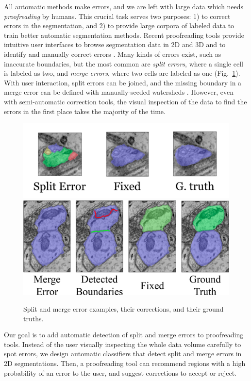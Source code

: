 All automatic methods make errors, and we are left with large data which needs \emph{proofreading} by humans. This crucial task serves two purposes: 1) to correct errors in the segmentation, and 2) to provide large corpora of labeled data to train better automatic segmentation methods. Recent proofreading tools provide intuitive user interfaces to browse segmentation data in 2D and 3D and to identify and manually correct errors \cite{markus_proofreading,raveler,mojo2,haehn_dojo_2014,karimov_guided_volume_editing,uzunbas}. Many kinds of errors exist, such as inaccurate boundaries, but the most common are \emph{split errors}, where a single cell is labeled as two, and \emph{merge errors}, where two cells are labeled as one (Fig.~\ref{fig:merge_error}). With user interaction, split errors can be joined, and the missing boundary in a merge error can be defined with manually-seeded watersheds \cite{haehn_dojo_2014}. However, even with semi-automatic correction tools, the visual inspection of the data to find the errors in the first place takes the majority of the time.

\begin{figure}[t]
\centering
\includegraphics[width=.45\textwidth]{gfx/spliterror.png}
\vspace{+.5mm}
\qquad
\includegraphics[width=.45\textwidth]{gfx/mergeerror.png}
\caption{Split and merge error examples, their corrections, and their ground truths.}
\label{fig:merge_error}
\end{figure}

Our goal is to add automatic detection of split and merge errors to proofreading tools. Instead of the user visually inspecting the whole data volume carefully to spot errors, we design automatic classifiers that detect split and merge errors in 2D segmentations. Then, a proofreading tool can recommend regions with a high probability of an error to the user, and suggest corrections to accept or reject.


